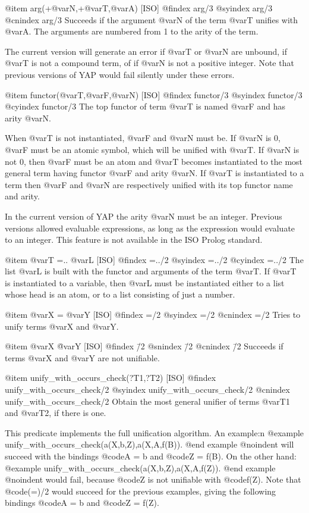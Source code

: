 {{{{@item arg(+@var{N},+@var{T},@var{A}) [ISO]
@findex arg/3
@syindex arg/3
@cnindex arg/3
Succeeds if the argument @var{N} of the term @var{T} unifies with
@var{A}. The arguments are numbered from 1 to the arity of the term.

The current version will generate an error if @var{T} or @var{N} are
unbound, if @var{T} is not a compound term, of if @var{N} is not a positive
integer. Note that previous versions of YAP would fail silently
under these errors.

@item functor(@var{T},@var{F},@var{N}) [ISO]
@findex functor/3
@syindex functor/3
@cyindex functor/3
The top functor of term @var{T} is named @var{F} and has  arity @var{N}.

When @var{T} is not instantiated, @var{F} and @var{N} must be. If
@var{N} is 0, @var{F} must be an atomic symbol, which will be unified
with @var{T}. If @var{N} is not 0, then @var{F} must be an atom and
@var{T} becomes instantiated to the most general term having functor
@var{F} and arity @var{N}. If @var{T} is instantiated to a term then
@var{F} and @var{N} are respectively unified with its top functor name
and arity.

In the current version of YAP the arity @var{N} must be an
integer. Previous versions allowed evaluable expressions, as long as the
expression would evaluate to an integer. This feature is not available
in the ISO Prolog standard.

@item @var{T} =.. @var{L} [ISO]
@findex =../2
@syindex =../2
@cyindex =../2
The list @var{L} is built with the functor and arguments of the term
@var{T}. If @var{T} is instantiated to a variable, then @var{L} must be
instantiated either to a list whose head is an atom, or to a list
consisting of just a number.

@item @var{X} = @var{Y} [ISO]
@findex =/2
@syindex =/2
@cnindex =/2
Tries to unify terms @var{X} and @var{Y}.

@item @var{X} \= @var{Y} [ISO]
@findex \=/2
@snindex \=/2
@cnindex \=/2
Succeeds if terms @var{X} and @var{Y} are not unifiable.

@item unify_with_occurs_check(?T1,?T2) [ISO]
@findex unify_with_occurs_check/2
@syindex unify_with_occurs_check/2
@cnindex unify_with_occurs_check/2
Obtain the most general unifier of terms @var{T1} and @var{T2}, if there
is one.

This predicate implements the full unification algorithm. An example:n
@example
unify_with_occurs_check(a(X,b,Z),a(X,A,f(B)).
@end example
@noindent
will succeed with the bindings @code{A = b} and @code{Z = f(B)}. On the
other hand:
@example
unify_with_occurs_check(a(X,b,Z),a(X,A,f(Z)).
@end example
@noindent
would fail, because @code{Z} is not unifiable with @code{f(Z)}. Note that
@code{(=)/2} would succeed for the previous examples, giving the following
bindings @code{A = b} and @code{Z = f(Z)}.


}}}}
